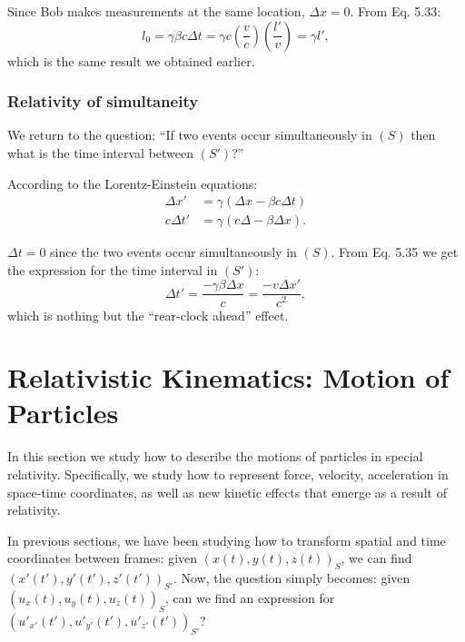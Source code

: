 \documentclass[a4paper,11pt]{article}
\numberwithin{equation}{section}
\begin{document}
 \noindent Since Bob makes measurements at the same location, $\Delta x = 0$. From Eq. 5.33:
 \begin{equation}
 l_0 = \gamma \beta c \Delta t = \gamma c \left( \frac{v}{c}\right) \left( \frac{l'}{v}\right)  = \gamma l',
 \end{equation}
 which is the same result we obtained earlier. 
 
 \subsubsection{Relativity of simultaneity}
 We return to the question: ``If two events occur simultaneously in $(S)$ then what is the time interval between $(S')$?''
 
 \noindent According to the Lorentz-Einstein equations:
 \begin{equation}
 \begin{split}
 \Delta x' &= \gamma(\Delta x - \beta c \Delta t)\\
 c\Delta t' &= \gamma(c\Delta - \beta\Delta x ).
 \end{split}
 \end{equation}
 
 \noindent $\Delta t = 0$ since the two events occur simultaneously in $(S)$. From Eq. 5.35 we get the expression for the time interval in $(S')$:
 \begin{equation}
 \Delta t' = \frac{-\gamma\beta\Delta x}{c}=\frac{-v\Delta x'}{c^2},
 \end{equation}
 which is nothing but the ``rear-clock ahead'' effect.
 
 \section{Relativistic Kinematics: Motion of Particles}
 In this section we study how to describe the motions of particles in special relativity. Specifically, we study how to represent force, velocity, acceleration in space-time coordinates, as well as new kinetic effects that emerge as a result of relativity. 
 
 \noindent In previous sections, we have been studying how to transform spatial and time coordinates between frames: given $\left( x(t),y(t),z(t)\right) _S$, we can find $\left( x'(t'),y'(t'),z'(t')\right) _{S'}$. Now, the question simply becomes: given $\left(u_x(t),u_y(t), u_z(t) \right) _S$, can we find an expression for $\left( {u'}_{x'}(t'),{u'}_{y'}(t'),{u'}_{z'}(t')\right)_{S'}$? 
 
\end{document}
